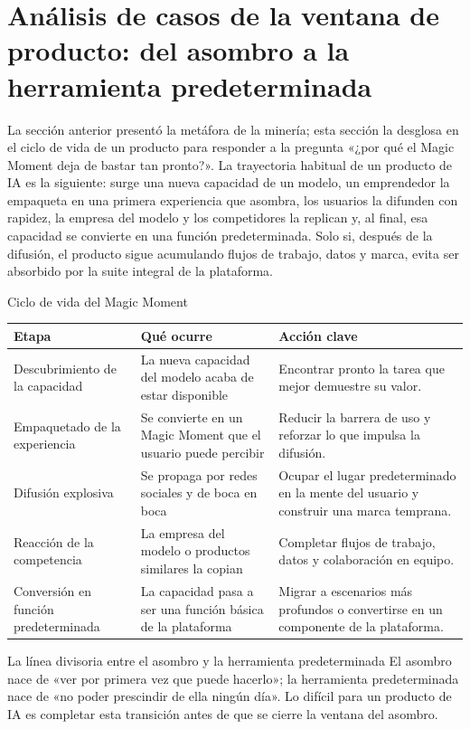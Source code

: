 \section{Análisis de casos de la ventana de producto: del asombro a la herramienta predeterminada}

La sección anterior presentó la metáfora de la minería; esta sección la desglosa en el ciclo de vida de un producto para responder a la pregunta «¿por qué el Magic Moment deja de bastar tan pronto?». La trayectoria habitual de un producto de IA es la siguiente: surge una nueva capacidad de un modelo, un emprendedor la empaqueta en una primera experiencia que asombra, los usuarios la difunden con rapidez, la empresa del modelo y los competidores la replican y, al final, esa capacidad se convierte en una función predeterminada. Solo si, después de la difusión, el producto sigue acumulando flujos de trabajo, datos y marca, evita ser absorbido por la suite integral de la plataforma.

\begin{knowledgebox}{Ciclo de vida del Magic Moment}
\begin{tabularx}{\textwidth}{p{}p{}X}
\toprule
Etapa & Qué ocurre & Acción clave \\
\midrule
Descubrimiento de la capacidad & La nueva capacidad del modelo acaba de estar disponible & Encontrar pronto la tarea que mejor demuestre su valor. \\
Empaquetado de la experiencia & Se convierte en un Magic Moment que el usuario puede percibir & Reducir la barrera de uso y reforzar lo que impulsa la difusión. \\
Difusión explosiva & Se propaga por redes sociales y de boca en boca & Ocupar el lugar predeterminado en la mente del usuario y construir una marca temprana. \\
Reacción de la competencia & La empresa del modelo o productos similares la copian & Completar flujos de trabajo, datos y colaboración en equipo. \\
Conversión en función predeterminada & La capacidad pasa a ser una función básica de la plataforma & Migrar a escenarios más profundos o convertirse en un componente de la plataforma. \\
\bottomrule
\end{tabularx}
\end{knowledgebox}

\begin{importantbox}{La línea divisoria entre el asombro y la herramienta predeterminada}
El asombro nace de «ver por primera vez que puede hacerlo»; la herramienta predeterminada nace de «no poder prescindir de ella ningún día». Lo difícil para un producto de IA es completar esta transición antes de que se cierre la ventana del asombro.
\end{importantbox}


